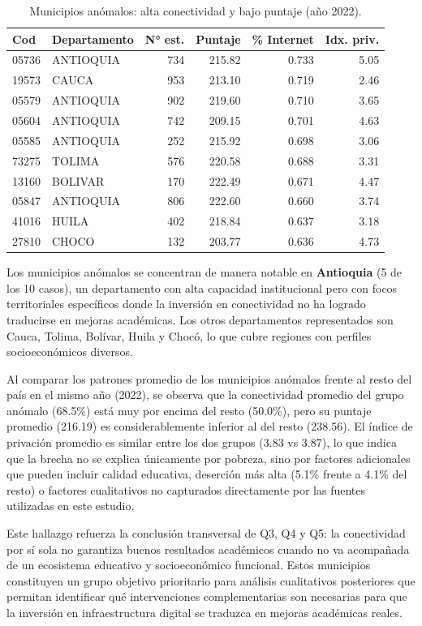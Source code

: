 \begin{table}[H]
\centering
\caption{Municipios anómalos: alta conectividad y bajo puntaje (año 2022).}
\begin{tabular}{l l r r r r}
\toprule
\textbf{Cod} & \textbf{Departamento} & \textbf{N° est.} & \textbf{Puntaje} & \textbf{\% Internet} & \textbf{Idx. priv.} \\
\midrule
05736 & ANTIOQUIA  & 734 & 215.82 & 0.733 & 5.05 \\
19573 & CAUCA      & 953 & 213.10 & 0.719 & 2.46 \\
05579 & ANTIOQUIA  & 902 & 219.60 & 0.710 & 3.65 \\
05604 & ANTIOQUIA  & 742 & 209.15 & 0.701 & 4.63 \\
05585 & ANTIOQUIA  & 252 & 215.92 & 0.698 & 3.06 \\
73275 & TOLIMA     & 576 & 220.58 & 0.688 & 3.31 \\
13160 & BOLIVAR    & 170 & 222.49 & 0.671 & 4.47 \\
05847 & ANTIOQUIA  & 806 & 222.60 & 0.660 & 3.74 \\
41016 & HUILA      & 402 & 218.84 & 0.637 & 3.18 \\
27810 & CHOCO      & 132 & 203.77 & 0.636 & 4.73 \\
\bottomrule
\end{tabular}
\end{table}

Los municipios anómalos se concentran de manera notable en \textbf{Antioquia} (5 de los 10 casos), un departamento con alta capacidad institucional pero con focos territoriales específicos donde la inversión en conectividad no ha logrado traducirse en mejoras académicas. Los otros departamentos representados son Cauca, Tolima, Bolívar, Huila y Chocó, lo que cubre regiones con perfiles socioeconómicos diversos.

Al comparar los patrones promedio de los municipios anómalos frente al resto del país en el mismo año (2022), se observa que la conectividad promedio del grupo anómalo (68.5\%) está muy por encima del resto (50.0\%), pero su puntaje promedio (216.19) es considerablemente inferior al del resto (238.56). El índice de privación promedio es similar entre los dos grupos (3.83 vs 3.87), lo que indica que la brecha no se explica únicamente por pobreza, sino por factores adicionales que pueden incluir calidad educativa, deserción más alta (5.1\% frente a 4.1\% del resto) o factores cualitativos no capturados directamente por las fuentes utilizadas en este estudio.

Este hallazgo refuerza la conclusión transversal de Q3, Q4 y Q5: la conectividad por sí sola no garantiza buenos resultados académicos cuando no va acompañada de un ecosistema educativo y socioeconómico funcional. Estos municipios constituyen un grupo objetivo prioritario para análisis cualitativos posteriores que permitan identificar qué intervenciones complementarias son necesarias para que la inversión en infraestructura digital se traduzca en mejoras académicas reales.
